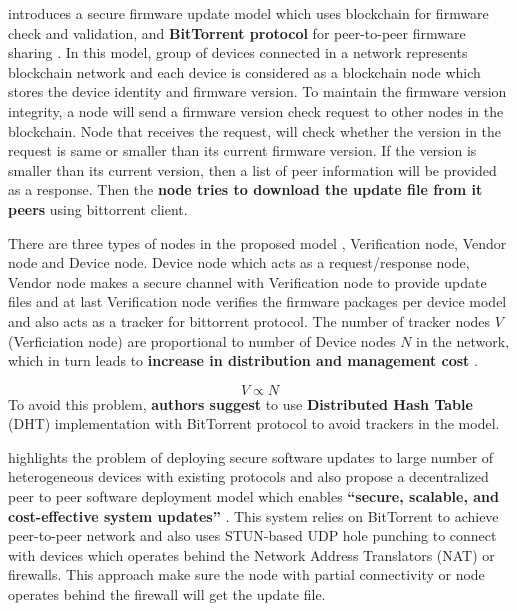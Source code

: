 \documentclass[12pt]{article}
\begin{document}
{\protect\NoHyper\citeauthor{lee2016blockchain}\protect\endNoHyper} \cite{lee2016blockchain} introduces a secure firmware update model which uses blockchain for firmware check and validation, and \textbf{BitTorrent protocol} for peer-to-peer firmware sharing \cite{lee2016blockchain}. In this model, group of devices connected in a network represents blockchain network and each device is considered as a blockchain node which stores the device identity and firmware version. To maintain the firmware version integrity, a node will send a firmware version check request to other nodes in the blockchain. Node that receives the request, will check whether the version in the request is same or smaller than its current firmware version. If the version is smaller than its current version, then a list of peer information will be provided as a response. Then the \textbf{node tries to download the update file from it peers} using bittorrent client. 


There are three types of nodes in the proposed model \cite{lee2016blockchain}, Verification node, Vendor node and Device node. Device node which acts as a request/response node, Vendor node makes a secure channel with Verification node to provide update files and at last Verification node verifies the firmware packages per device model and also acts as a tracker for bittorrent protocol. The number of tracker nodes $V$ (Verficiation node) are proportional to number of Device nodes $N$ in the network, which in turn leads to \textbf{increase in distribution and management cost} \cite{lee2016blockchain}. 

$$V \propto N$$
To avoid this problem, \textbf{authors suggest} to use \textbf{Distributed Hash Table} (DHT) implementation with BitTorrent protocol to avoid trackers in the model.

{\protect\NoHyper\citeauthor{herry2018peer}\protect\endNoHyper} \cite{herry2018peer} highlights the problem of deploying secure software updates to large number of heterogeneous devices with existing protocols and also propose a decentralized peer to peer software deployment model which enables \textbf{``secure, scalable, and cost-effective system updates''} \cite{herry2018peer}.  This system relies on BitTorrent to achieve peer-to-peer network and also uses STUN-based UDP hole punching to connect with devices which operates behind the Network Address Translators (NAT) or firewalls. This approach make sure the node with partial connectivity or node operates behind the firewall will get the update file.
\end{document}
